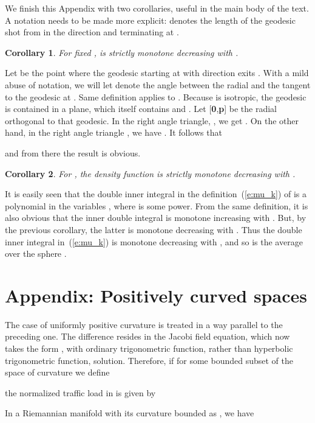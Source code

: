 \documentclass{article}
\newtheorem{corollary}{Corollary}
\newenvironment{proof}
{\noindent {\bf Proof.}}
{}
\begin{document}
We finish this Appendix with two corollaries, useful in the main body of the text. 
A notation needs to be made more explicit:  denotes the length of the geodesic 
shot from  in the direction  and terminating at . 
\begin{corollary}
For fixed , 
 is strictly monotone decreasing with . 
\end{corollary}
\begin{proof}
Let  be the point where the geodesic starting at  with direction  exits . 
With a mild abuse of notation, we will let  denote the angle between the radial   
and the tangent to the geodesic at . Same definition applies to . 
Because  is isotropic, 
the geodesic  is contained in a plane, 
which itself contains  and . 
Let [\textbf{0},\textbf{p}] be the radial orthogonal to that geodesic. 
In the right angle triangle, , 
we get 
. 
On the other hand, in the right angle triangle , 
we have . 
It follows that 

and from there the result is obvious. 
\end{proof}

\begin{corollary}
For , the density function  is strictly monotone decreasing with .
\end{corollary}

\begin{proof}
It is easily seen that the double inner integral in the definition~(\ref{e:mu_k}) of   
is a polynomial in the variables , where  is some power. 
From the same definition, it is also obvious that the inner double integral is monotone increasing with 
. But, by the previous corollary, the latter is monotone decreasing with . 
Thus the double inner integral in~(\ref{e:mu_k}) is monotone decreasing with , and so is the average 
over the sphere . 
\end{proof}

\section{Appendix: Positively curved spaces}
\label{s:app_positive}

The case of uniformly positive curvature  is treated in a way parallel to the preceding one. 
The difference resides in the Jacobi field equation, 
which now takes the form ,  
with ordinary trigonometric function, rather than hyperbolic trigonometric function, solution. 
Therefore, if for some bounded subset  of the space of curvature  we define 

the normalized traffic load in  is given by

In a Riemannian manifold with its curvature bounded as , we have 










%
 
\end{document}
